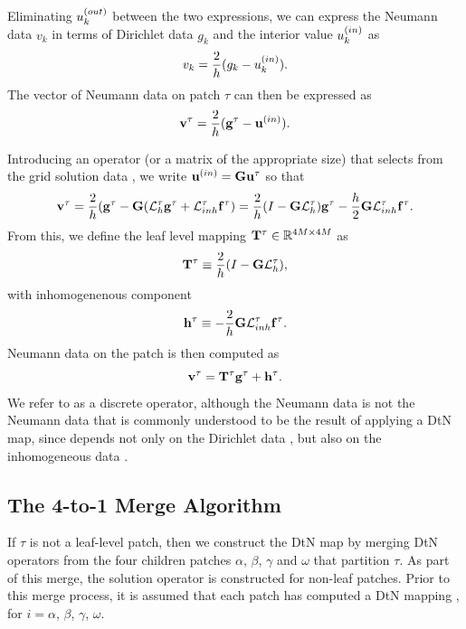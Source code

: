 Eliminating $u_k^{(out)}$  between the two expressions, we  can express the Neumann data $v_k$ in terms of Dirichlet data $g_k$ and the interior value $u_k^{(in)}$ as
\begin{equation}
v_k = \frac{2}{h}(g_k - u_k^{(in)}).
\end{equation}
The vector of Neumann data on patch $\tau$ can then be expressed as 
\begin{equation}
\mathbf v^{\tau} = \frac{2}{h}(\mathbf g^{\tau} - \mathbf u^{(in)}).
\end{equation}   

Introducing an operator (or a matrix of the appropriate size) \Gop that selects \uin from the grid solution data \utau, we write $\mathbf u^{(in)} = \mathbf G \mathbf u^{\tau}$ so that
\begin{equation}
\mathbf v^{\tau} = \frac{2}{h}(\mathbf g^{\tau} - \mathbf G (\mathcal L_h^{\tau} \mathbf g^{\tau} + \mathcal L_{inh}^{\tau} \mathbf f^{\tau}) = 
\frac{2}{h}(I - \mathbf G \mathcal L_h^{\tau})\mathbf g^{\tau} - \frac{h}{2}\mathbf G \mathcal L_{inh}^{\tau} \mathbf f^{\tau}.
\end{equation}
From this, we define the leaf level \DtN mapping $\mathbf T^{\tau} \in \mathbb R^{4M \times 4M}$ as
\begin{equation}
\mathbf T^{\tau} \equiv \frac{2}{h}(I - \mathbf G\mathcal L_h^{\tau}),
\label{eq:Ttau-leaf}
\end{equation}
with inhomogenenous component
\begin{equation}
\mathbf h^{\tau} \equiv -\frac{2}{h}\mathbf G\mathcal L_{inh}^{\tau} \mathbf f^{\tau}.
\label{eq:htau-leaf}
\end{equation}
Neumann data on the patch is then computed as
\begin{equation}
\mathbf v^{\tau} = \mathbf T^{\tau} \mathbf g^{\tau} + \mathbf h^{\tau}.
\label{eq:vtau}
\end{equation}
We refer to \Ttau as a discrete \DtN operator, although the Neumann data \vtau is not the Neumann data that is commonly understood to be the result of applying a DtN map, since \vtau depends not only on the Dirichlet data \gtau, but also on the inhomogeneous data \ftau.  

\subsection{The 4-to-1 Merge Algorithm}
\label{sub:4-to-1merge}
If $\tau$ is not a leaf-level patch, then we construct the DtN map  by merging DtN operators from the four children patches $\alpha$, $\beta$, $\gamma$ and $\omega$ that partition $\tau$. As part of this merge, the solution operator \Stau is constructed for non-leaf patches. Prior to this merge process, it is assumed that each patch has computed a DtN mapping \Ti, for $i=\alpha$, $\beta$, $\gamma$, $\omega$. 


